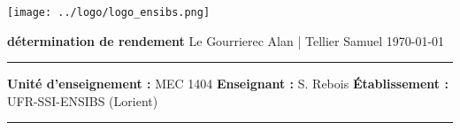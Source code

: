 \documentclass[french,12pt,a4paper]{report}
\begin{document}
\begin{titlepage}

\texttt{[image: ../logo/logo\_ensibs.png]} 
\vspace{5 cm}

\begin{center}
\Huge{\textbf{détermination de rendement}}
\large
Le Gourrierec Alan | Tellier Samuel
\today

\end{center}
\vspace{4 cm}
\hspace{-0.72cm}
\rule{1\linewidth}{1pt} 
\large{
\textbf{Unité d'enseignement : } MEC 1404
\textbf{Enseignant : }S. Rebois
\textbf{Établissement :} UFR-SSI-ENSIBS (Lorient)
}
\rule{1\linewidth}{1pt}
\end{titlepage}

\normalsize

\newpage
    
\tableofcontents

\newpage
\end{document}

